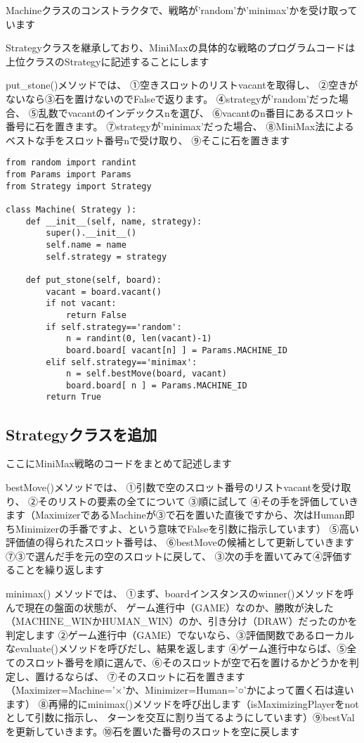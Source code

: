 \documentclass[uplatex,a4paper,11pt,oneside,openany]{jsbook}
\begin{document}
Machineクラスのコンストラクタで、戦略が'random'か'minimax'かを受け取っています

Strategyクラスを継承しており、MiniMaxの具体的な戦略のプログラムコードは
上位クラスのStrategyに記述することにします

put\_stone()メソッドでは、
①空きスロットのリストvacantを取得し、
②空きがないなら③石を置けないのでFalseで返ります。
④strategyが'random'だった場合、
⑤乱数でvacantのインデックスnを選び、
⑥vacantのn番目にあるスロット番号に石を置きます。
⑦strategyが'minimax'だった場合、
⑧MiniMax法によるベストな手をスロット番号nで受け取り、
⑨そこに石を置きます

\begin{lstlisting}[caption=Machine.py,label=minimax06]
from random import randint
from Params import Params
from Strategy import Strategy

class Machine( Strategy ):
    def __init__(self, name, strategy):
        super().__init__()
        self.name = name
        self.strategy = strategy

    def put_stone(self, board):
        vacant = board.vacant()
        if not vacant:
            return False
        if self.strategy=='random':
            n = randint(0, len(vacant)-1)
            board.board[ vacant[n] ] = Params.MACHINE_ID
        elif self.strategy=='minimax':
            n = self.bestMove(board, vacant)
            board.board[ n ] = Params.MACHINE_ID
        return True
\end{lstlisting}

\subsection{Strategyクラスを追加}

ここにMiniMax戦略のコードをまとめて記述します

bestMove()メソッドでは、
①引数で空のスロット番号のリストvacantを受け取り、
②そのリストの要素の全てについて
③順に試して
④その手を評価していきます（MaximizerであるMachineが③で石を置いた直後ですから、次はHuman即ちMinimizerの手番ですよ、という意味でFalseを引数に指示しています）
⑤高い評価値の得られたスロット番号は、
⑥bestMoveの候補として更新していきます
⑦③で選んだ手を元の空のスロットに戻して、
③次の手を置いてみて④評価することを繰り返します

minimax() メソッドでは、
①まず、boardインスタンスのwinner()メソッドを呼んで現在の盤面の状態が、
ゲーム進行中（GAME）なのか、勝敗が決した（MACHINE\_WINかHUMAN\_WIN）のか、引き分け（DRAW）だったのかを判定します
②ゲーム進行中（GAME）でないなら、③評価関数であるローカルなevaluate()メソッドを呼びだし、結果を返します
④ゲーム進行中ならば、⑤全てのスロット番号を順に選んで、⑥そのスロットが空で石を置けるかどうかを判定し、置けるならば、
⑦そのスロットに石を置きます（Maximizer=Machine='×'か、Minimizer=Human='○'かによって置く石は違います）
⑧再帰的にminimax()メソッドを呼び出します（isMaximizingPlayerをnotとして引数に指示し、
ターンを交互に割り当てるようにしています）⑨bestValを更新していきます。⑩石を置いた番号のスロットを空に戻します
\end{document}
